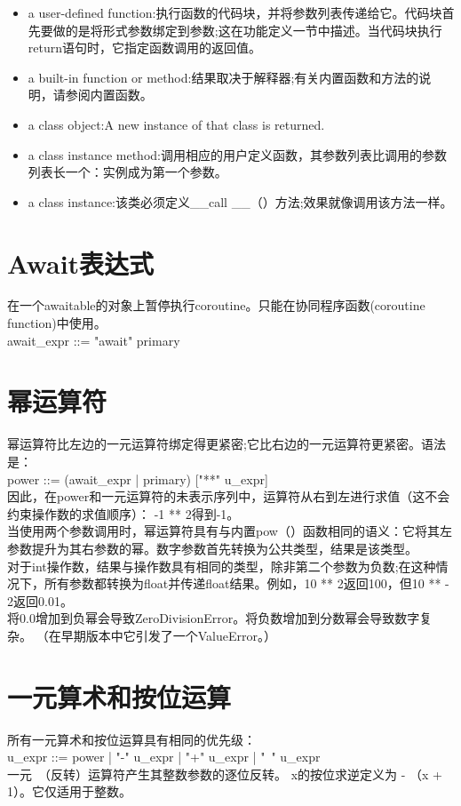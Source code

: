 \documentclass[10pt,UTF8]{ctexart}
\begin{document}
\begin{itemize}
\item a user-defined function:执行函数的代码块，并将参数列表传递给它。代码块首先要做的是将形式参数绑定到参数;这在功能定义一节中描述。当代码块执行return语句时，它指定函数调用的返回值。
\item a built-in function or method:结果取决于解释器;有关内置函数和方法的说明，请参阅内置函数。
\item a class object:A new instance of that class is returned.
\item a class instance method:调用相应的用户定义函数，其参数列表比调用的参数列表长一个：实例成为第一个参数。
\item a class instance:该类必须定义__call __（）方法;效果就像调用该方法一样。
\end{itemize}

\section{Await表达式}
在一个awaitable的对象上暂停执行coroutine。只能在协同程序函数(coroutine function)中使用。\\
await_expr ::= "await" primary
\section{幂运算符}
幂运算符比左边的一元运算符绑定得更紧密;它比右边的一元运算符更紧密。语法是：\\
power ::=  (await_expr | primary) ["**" u_expr]\\
\indent 因此，在power和一元运算符的未表示序列中，运算符从右到左进行求值（这不会约束操作数的求值顺序）： -1 ** 2得到-1。\\
\indent 当使用两个参数调用时，幂运算符具有与内置pow（）函数相同的语义：它将其左参数提升为其右参数的幂。数字参数首先转换为公共类型，结果是该类型。\\
\indent 对于int操作数，结果与操作数具有相同的类型，除非第二个参数为负数;在这种情况下，所有参数都转换为float并传递float结果。例如，10 ** 2返回100，但10 ** - 2返回0.01。\\
\indent 将0.0增加到负幂会导致ZeroDivisionError。将负数增加到分数幂会导致数字复杂。 （在早期版本中它引发了一个ValueError。）
\section{一元算术和按位运算}
所有一元算术和按位运算具有相同的优先级：\\
u_expr ::= power | "-" u_expr | "+" u_expr | "~" u_expr \\
\indent 一元~（反转）运算符产生其整数参数的逐位反转。 x的按位求逆定义为 - （x + 1）。它仅适用于整数。
\end{document}
